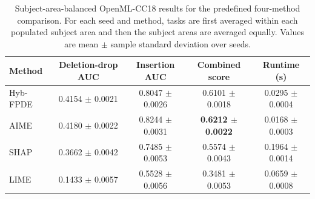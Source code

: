 \begin{table}[!tbp]
    \caption{Subject-area-balanced OpenML-CC18 results for the predefined four-method comparison. For each seed and method, tasks are first averaged within each populated subject area and then the subject areas are averaged equally. Values are mean $\pm$ sample standard deviation over seeds.}
    \label{tab:main_results}
    \centering
    \begin{tabular}{lcccc}
        \toprule
        Method & Deletion-drop AUC & Insertion AUC & Combined score & Runtime (s)  \\
        \midrule
        Hyb-FPDE & 0.4154 $\pm$ 0.0021 & 0.8047 $\pm$ 0.0026 & 0.6101 $\pm$ 0.0018 & 0.0295 $\pm$ 0.0004 \\
        AIME & 0.4180 $\pm$ 0.0022 & 0.8244 $\pm$ 0.0031 & \textbf{0.6212 $\pm$ 0.0022} & 0.0168 $\pm$ 0.0003 \\
        SHAP & 0.3662 $\pm$ 0.0042 & 0.7485 $\pm$ 0.0053 & 0.5574 $\pm$ 0.0043 & 0.1964 $\pm$ 0.0014 \\
        LIME & 0.1433 $\pm$ 0.0057 & 0.5528 $\pm$ 0.0056 & 0.3481 $\pm$ 0.0053 & 0.0659 $\pm$ 0.0008 \\
        \bottomrule
    \end{tabular}
\end{table}
